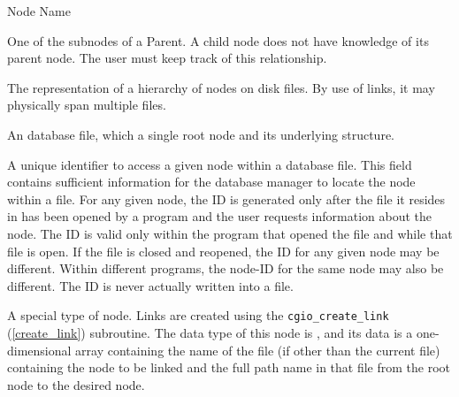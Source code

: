 \begin{Ventryi}{Node Name}
\item [Child]
      One of the subnodes of a Parent.
      A child node does not have knowledge of its parent node.
      The user must keep track of this relationship.
\item [Database]
      The representation of a hierarchy of nodes on disk files.
      By use of links, it may physically span multiple files.
\item [File]
      An database file, which a single root node and its underlying structure.
\item [ID]
      A unique identifier to access a given node within a database file.
      This field contains sufficient information for the database manager
      to locate the node within a file.
      For any given node, the ID is generated only after the file it
      resides in has been opened by a program and the user requests
      information about the node.
      The ID is valid only within the program that opened the file and
      while that file is open.
      If the file is closed and reopened, the ID for any given node
      may be different. Within different programs, the node-ID for the
      same node may also be different.
      The ID is never actually written into a file.
\item [Link-Node]
      A special type of node.
      Links are created using the
      \texttt{cgio\_create\_link} (\autoref{create_link})
      subroutine.
      The data type of this node is , and its data is a
      one-dimensional array containing the name of the file (if other
      than the current file) containing the node to be linked and the
      full path name in that file from the root node to the desired
      node.


\end{Ventryi}
